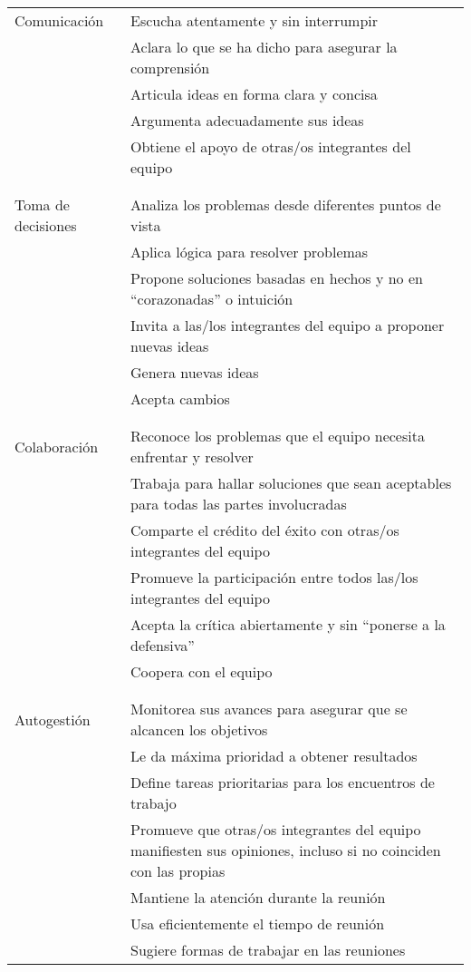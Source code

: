\noindent
\begin{longtable}{p{}p{}}

  Comunicación
  & Escucha atentamente y sin interrumpir \\
  & Aclara lo que se ha dicho para asegurar la comprensión \\
  & Articula ideas en forma clara y concisa \\
  & Argumenta adecuadamente sus ideas \\
  & Obtiene el apoyo de otras/os integrantes del equipo \\
  \\ [-1.5ex] \hline \\ [-1.5ex]

  Toma de decisiones
  & Analiza los problemas desde diferentes puntos de vista \\
  & Aplica lógica para resolver problemas \\
  & Propone soluciones basadas en hechos y no en ``corazonadas'' o intuición \\
  & Invita a las/los integrantes del equipo a proponer nuevas ideas \\
  & Genera nuevas ideas \\
  & Acepta cambios \\
  \\ [-1.5ex] \hline \\ [-1.5ex]

  Colaboración
  & Reconoce los problemas que el equipo necesita enfrentar y resolver \\
  & Trabaja para hallar soluciones que sean aceptables para todas las partes involucradas \\
  & Comparte el crédito del éxito con otras/os integrantes del equipo \\
  & Promueve la participación entre todos las/los integrantes del equipo \\
  & Acepta la crítica abiertamente y sin ``ponerse a la defensiva'' \\
  & Coopera con el equipo \\
  \\ [-1.5ex] \hline \\ [-1.5ex]

  Autogestión
  & Monitorea sus avances para asegurar que se alcancen los objetivos \\
  & Le da máxima prioridad a obtener resultados \\
  & Define tareas prioritarias para los encuentros de trabajo \\
  & Promueve que otras/os integrantes del equipo manifiesten sus opiniones, incluso si no coinciden con las propias \\
  & Mantiene la atención durante la reunión \\
  & Usa eficientemente el tiempo de reunión \\
  & Sugiere formas de trabajar en las reuniones \\

\end{longtable}

